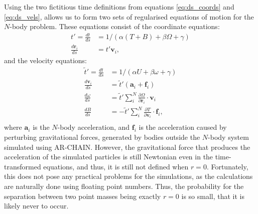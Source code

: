 \documentclass[english, twoside]{HYgradu}
\begin{document}
Using the two fictitious time definitions from equations \ref{eq:ds_coords} and \ref{eq:ds_vels}, allows us to form two sets of regularised equations of motion for the $N$-body problem. These equations consist of the coordinate equations:
\begin{equation}
\begin{split}
t' = \frac{dt}{ds} &= 1/(\alpha(T+B) + \beta\Omega + \gamma) \\
\frac{d\mathbf{r}_i}{ds} &= t' \mathbf{v}_i,
\end{split}
\end{equation}
and the velocity equations:
\begin{equation}
\begin{split}
\tilde{t}' = \frac{dt}{ds} &= 1/(\alpha U + \beta\omega + \gamma) \\
\frac{d\mathbf{v}_i}{ds} &= \tilde{t}' (\mathbf{a}_i + \mathbf{f}_i) \\
\frac{d\omega}{ds} &= \tilde{t}' \displaystyle\sum^N_i \frac{\partial \Omega}{\partial \mathbf{r}_i} \cdot \mathbf{v}_i \\
\frac{dB}{ds} &= -\tilde{t}' \displaystyle\sum^N_i \frac{\partial T}{\partial \mathbf{v}_i} \cdot \mathbf{f}_i, \\
\end{split}
\end{equation}
where $\mathbf{a}_i$ is the $N$-body acceleration, and $\mathbf{f}_i$ is the acceleration caused by perturbing gravitational forces, generated by bodies outside the $N$-body system simulated using AR-CHAIN. However, the gravitational force that produces the acceleration of the simulated particles is still Newtonian even in the time-transformed equations, and thus, it is still not defined when $r=0$. Fortunately, this does not pose any practical problems for the simulations, as the calculations are naturally done using floating point numbers. Thus, the probability for the separation between two point masses being exactly $r=0$ is so small, that it is likely never to occur.
\end{document}
